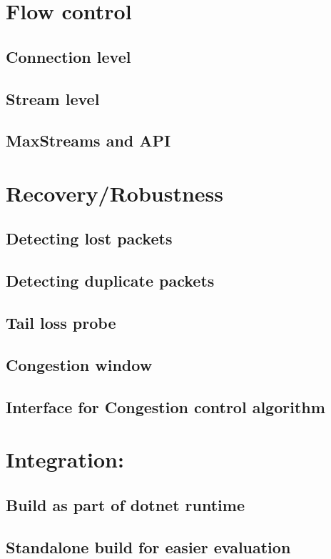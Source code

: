 \section{Flow control}

\subsection{Connection level}
\subsection{Stream level}
\subsection{MaxStreams and API}


\section{Recovery/Robustness}

\subsection{Detecting lost packets}
\subsection{Detecting duplicate packets}
\subsection{Tail loss probe}
\subsection{Congestion window}
\subsection{Interface for Congestion control algorithm}

\section{Integration:}


\subsection{Build as part of dotnet runtime}
\subsection{Standalone build for easier evaluation}

